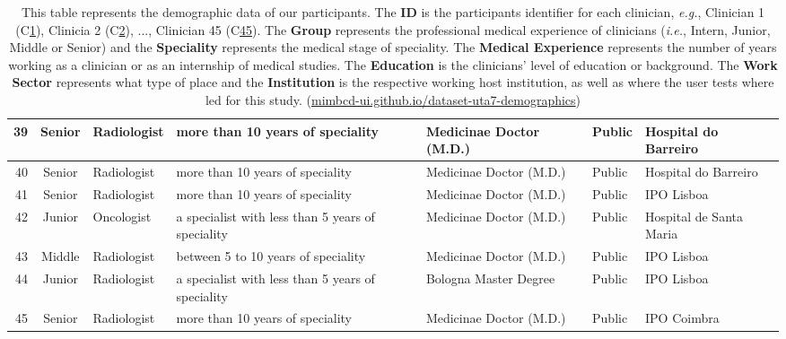 \begin{landscape}
\begin{table}[htbp]
{\begin{tabular}{|r|c|l|l|l|l|l|}
39          & Senior         & Radiologist                      & more than 10 years of speciality                      & Medicinae Doctor (M.D.)                       & Public               & Hospital do Barreiro      \\ \hline
40          & Senior         & Radiologist                      & more than 10 years of speciality                      & Medicinae Doctor (M.D.)                       & Public               & Hospital do Barreiro      \\ \hline
41          & Senior         & Radiologist                      & more than 10 years of speciality                      & Medicinae Doctor (M.D.)                       & Public               & IPO Lisboa                \\ \hline
42          & Junior         & Oncologist                       & a specialist with less than 5 years of speciality     & Medicinae Doctor (M.D.)                       & Public               & Hospital de Santa Maria   \\ \hline
43          & Middle         & Radiologist                      & between 5 to 10 years of speciality                   & Medicinae Doctor (M.D.)                       & Public               & IPO Lisboa                \\ \hline
44          & Junior         & Radiologist                      & a specialist with less than 5 years of speciality     & Bologna Master Degree                         & Public               & IPO Lisboa                \\ \hline
45          & Senior         & Radiologist                      & more than 10 years of speciality                      & Medicinae Doctor (M.D.)                       & Public               & IPO Coimbra               \\ \hline
\end{tabular}%
}
\caption{This table represents the demographic data of our participants. The {\bf ID} is the participants identifier for each clinician, {\it e.g.}, Clinician 1 (C\underline{1}), Clinicia 2 (C\underline{2}), ..., Clinician 45 (C\underline{45}). The {\bf Group} represents the professional medical experience of clinicians ({\it i.e.}, Intern, Junior, Middle or Senior) and the {\bf Speciality} represents the medical stage of speciality. The {\bf Medical Experience} represents the number of years working as a clinician or as an internship of medical studies. The {\bf Education} is the clinicians' level of education or background. The {\bf Work Sector} represents what type of place and the {\bf Institution} is the respective working host institution, as well as where the user tests where led for this study. (\href{https://mimbcd-ui.github.io/dataset-uta7-demographics}{mimbcd-ui.github.io/dataset-uta7-demographics})}
\label{tab:tab003}
\end{table}
\end{landscape}